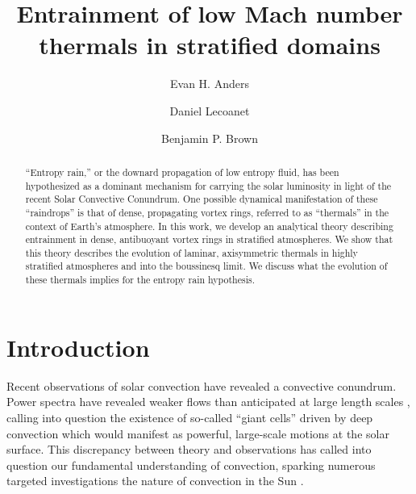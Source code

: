 \documentclass[twocolumn, amsmath, amsfonts, amssymb, trackchanges]{aastex62}
\begin{document}
\title{Entrainment of low Mach number thermals in stratified domains}


\author[0000-0002-3433-4733]{Evan H. Anders}
\author[0000-0002-7635-9728]{Daniel Lecoanet}
\author[0000-0001-8935-219X]{Benjamin P. Brown}


\begin{abstract}
``Entropy rain,'' or the downard propagation of low entropy fluid, has been hypothesized as a dominant mechanism for carrying the solar luminosity in light of the recent Solar Convective Conundrum.
One possible dynamical manifestation of these ``raindrops'' is that of dense, propagating vortex rings, referred to as ``thermals'' in the context of Earth's atmosphere.
In this work, we develop an analytical theory describing entrainment in dense, antibuoyant vortex rings in stratified atmospheres.
We show that this theory describes the evolution of laminar, axisymmetric thermals in highly stratified atmospheres and into the boussinesq limit.
We discuss what the evolution of these thermals implies for the entropy rain hypothesis.
\end{abstract}


\section{Introduction}
\label{sec:intro}
Recent observations of solar convection have revealed a convective conundrum.
Power spectra have revealed weaker flows than anticipated at large length scales \citep{hanasoge&all2012, greer&all2015}, calling into question the existence of so-called ``giant cells'' driven by deep convection which would manifest as powerful, large-scale motions at the solar surface. 
This discrepancy between theory and observations has called into question our fundamental understanding of convection, sparking numerous targeted investigations the nature of convection in the Sun  \citep{featherstone&hindman2016, omara&all2016, cossette&rast2016, kapyla&all2017, hotta2017}.
\end{document}

